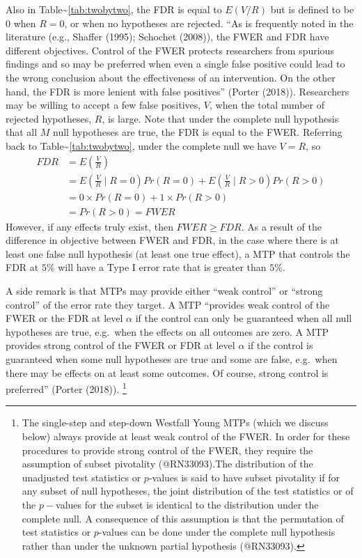 \documentclass[
]{article}
\begin{document}
Also in Table\textasciitilde{}\ref{tab:twobytwo}, the FDR is equal to
\(E(V/R)\) but is defined to be \(0\) when \(R=0\), or when no
hypotheses are rejected. ``As is frequently noted in the literature
(e.g., Shaffer (1995); Schochet (2008)), the FWER and FDR have different
objectives. Control of the FWER protects researchers from spurious
findings and so may be preferred when even a single false positive could
lead to the wrong conclusion about the effectiveness of an intervention.
On the other hand, the FDR is more lenient with false positives''
(Porter (2018)). Researchers may be willing to accept a few false
positives, \(V\), when the total number of rejected hypotheses, \(R\),
is large. Note that under the complete null hypothesis that all \(M\)
null hypotheses are true, the FDR is equal to the FWER. Referring back
to Table\textasciitilde{}\ref{tab:twobytwo}, under the complete null we
have \(V = R\), so \begin{align*}
FDR &= E\left(\frac{V}{R}\right)\\
&=  E\left(\frac{V}{R}\mid R = 0\right) Pr(R = 0) + E\left(\frac{V}{R} \mid R > 0\right)Pr(R > 0) \\
&= 0 \times Pr(R = 0) + 1 \times Pr(R > 0) \\
&= Pr(R > 0) = FWER
\end{align*} However, if any effects truly exist, then
\(FWER \geq FDR\). As a result of the difference in objective between
FWER and FDR, in the case where there is at least one false null
hypothesis (at least one true effect), a MTP that controls the FDR at
\(5\%\) will have a Type I error rate that is greater than \(5\%\).

A side remark is that MTPs may provide either ``weak control'' or
``strong control'' of the error rate they target. A MTP ``provides weak
control of the FWER or the FDR at level \(\alpha\) if the control can
only be guaranteed when all null hypotheses are true, e.g.~when the
effects on all outcomes are zero. A MTP provides strong control of the
FWER or FDR at level \(\alpha\) if the control is guaranteed when some
null hypotheses are true and some are false, e.g.~when there may be
effects on at least some outcomes. Of course, strong control is
preferred'' (Porter (2018)).
\footnote{The single-step and step-down Westfall Young MTPs (which we discuss below) always provide at least weak control of the FWER. In order for these procedures to provide strong control of the FWER, they require the assumption of subset pivotality (@RN33093).The distribution of the unadjusted test statistics or $p$-values is said to have subset pivotality if for any subset of null hypotheses, the joint distribution of the test statistics or of the $p-$values for the subset is identical to the distribution under the complete null.
A consequence of this assumption is that the permutation of test statistics or $p$-values can be done under the complete null hypothesis rather than under the unknown partial hypothesis (@RN33093).}
\end{document}
